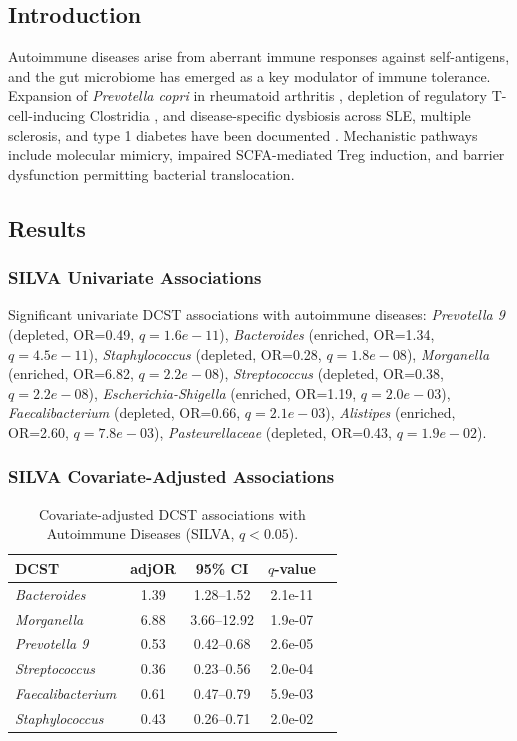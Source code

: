 \documentclass[11pt,a4paper]{article}
\begin{document}
\subsection{Introduction}
Autoimmune diseases arise from aberrant immune responses against self-antigens, and the gut microbiome has emerged as a key modulator of immune tolerance. Expansion of \textit{Prevotella copri} in rheumatoid arthritis \cite{Scher2013_Prevotella_RA}, depletion of regulatory T-cell-inducing Clostridia \cite{Atarashi2013_Clostridia_Treg}, and disease-specific dysbiosis across SLE, multiple sclerosis, and type 1 diabetes have been documented \cite{DeLuca2019_autoimmune,Vatanen2018_T1D}. Mechanistic pathways include molecular mimicry, impaired SCFA-mediated Treg induction, and barrier dysfunction permitting bacterial translocation.

\subsection{Results}
\subsubsection{SILVA Univariate Associations}
Significant univariate DCST associations with autoimmune diseases: \textit{Prevotella 9} (depleted, OR=0.49, $q=1.6e-11$), \textit{Bacteroides} (enriched, OR=1.34, $q=4.5e-11$), \textit{Staphylococcus} (depleted, OR=0.28, $q=1.8e-08$), \textit{Morganella} (enriched, OR=6.82, $q=2.2e-08$), \textit{Streptococcus} (depleted, OR=0.38, $q=2.2e-08$), \textit{Escherichia-Shigella} (enriched, OR=1.19, $q=2.0e-03$), \textit{Faecalibacterium} (depleted, OR=0.66, $q=2.1e-03$), \textit{Alistipes} (enriched, OR=2.60, $q=7.8e-03$), \textit{Pasteurellaceae} (depleted, OR=0.43, $q=1.9e-02$).

\subsubsection{SILVA Covariate-Adjusted Associations}
\begin{table}[H]\centering\small
\caption{Covariate-adjusted DCST associations with Autoimmune Diseases (SILVA, $q<0.05$).}\label{tab:Autoimmune_adj}
\begin{tabular}{lcccc}
\toprule
DCST & adjOR & 95\% CI & $q$-value \\
\midrule
\textit{Bacteroides} & 1.39 & 1.28--1.52 & 2.1e-11 \\
\textit{Morganella} & 6.88 & 3.66--12.92 & 1.9e-07 \\
\textit{Prevotella 9} & 0.53 & 0.42--0.68 & 2.6e-05 \\
\textit{Streptococcus} & 0.36 & 0.23--0.56 & 2.0e-04 \\
\textit{Faecalibacterium} & 0.61 & 0.47--0.79 & 5.9e-03 \\
\textit{Staphylococcus} & 0.43 & 0.26--0.71 & 2.0e-02 \\
\bottomrule
\end{tabular}\end{table}
\end{document}
